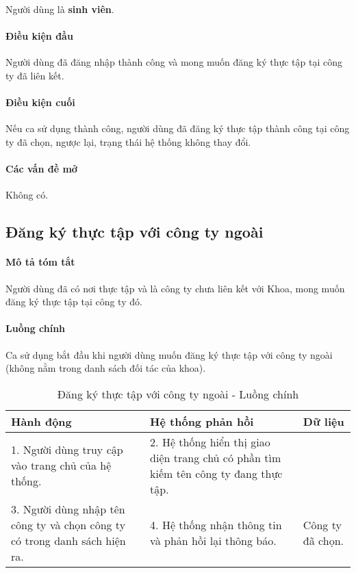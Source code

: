 \documentclass[./../main.tex]{subfiles}
\begin{document}
Người dùng là \textbf{sinh viên}.

\paragraph*{Điều kiện đầu}

Người dùng đã đăng nhập thành công và mong muốn đăng ký thực tập tại
công ty đã liên kết.

\paragraph*{Điều kiện cuối}

Nếu ca sử dụng thành công, người dùng đã đăng ký thực tập thành công tại
công ty đã chọn, ngược lại, trạng thái hệ thống không thay đổi.

\paragraph*{Các vấn đề mở}

Không có.

\subsection{Đăng ký thực tập với công ty ngoài}

\paragraph*{Mô tả tóm tắt}

Người dùng đã có nơi thực tập và là công ty chưa liên kết với Khoa, mong
muốn đăng ký thực tập tại công ty đó.

\paragraph*{Luồng chính} Ca sử dụng bắt đầu khi người dùng muốn đăng ký thực tập với công ty ngoài (không nằm trong danh sách đối tác của khoa).

\begin{table}[H]
	\caption{Đăng ký thực tập với công ty ngoài - Luồng chính}
	\label{tab:register_other_company}
	\begin{tabularx}{\textwidth}{|X|X|X|}
		\hline
		\textbf{Hành động}                                                         & \textbf{Hệ thống phản hồi}                                                           & \textbf{Dữ liệu} \\ \hline
		1. Người dùng truy cập vào trang chủ của hệ thống.                         & 2. Hệ thống hiển thị giao diện trang chủ có phần tìm kiếm tên công ty đang thực tập. &                  \\ \hline
		3. Người dùng nhập tên công ty và chọn công ty có trong danh sách hiện ra. & 4. Hệ thống nhận thông tin và phản hồi lại thông báo.                                & Công ty đã chọn. \\ \hline
	\end{tabularx}
\end{table}
\end{document}
